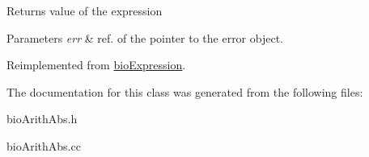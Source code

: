 \begin{DoxyReturn}{Returns}
value of the expression 
\end{DoxyReturn}

\begin{DoxyParams}{Parameters}
{\em err} & ref. of the pointer to the error object. \\
\hline
\end{DoxyParams}


Reimplemented from \hyperlink{classbio_expression_af58662a5d4d456f15bc4f2c9bd4f8a5b}{bio\+Expression}.



The documentation for this class was generated from the following files\+:\begin{DoxyCompactItemize}
\item 
bio\+Arith\+Abs.\+h\item 
bio\+Arith\+Abs.\+cc\end{DoxyCompactItemize}
